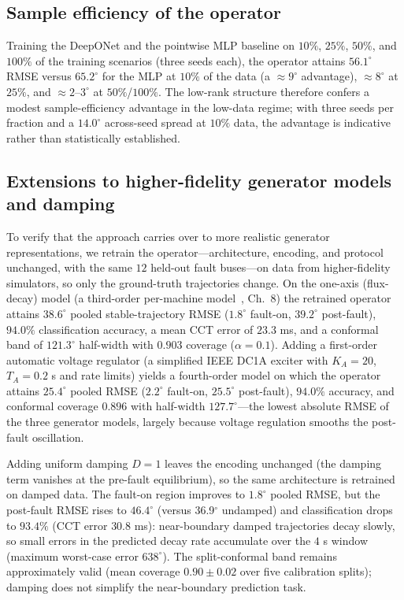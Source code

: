 \documentclass[5p,times]{elsarticle}
\newcommand{\rmsePost}{36.9}          %
\begin{document}
\subsection{Sample efficiency of the operator}
\label{sec:sampleeff}
Training the DeepONet
and the pointwise MLP baseline on $10\%$, $25\%$, $50\%$, and $100\%$ of the training scenarios
(three seeds each), the operator attains $56.1^\circ$ RMSE versus $65.2^\circ$ for the MLP at
$10\%$ of the data (a $\approx9^\circ$ advantage), $\approx8^\circ$ at $25\%$, and
$\approx2$--$3^\circ$ at $50\%$/$100\%$. The low-rank structure therefore confers a modest
sample-efficiency advantage in the low-data regime; with three seeds per fraction and a
$14.0^\circ$ across-seed spread at $10\%$ data, the advantage is indicative rather than
statistically established. 

\subsection{Extensions to higher-fidelity generator models and damping}
To verify that the approach carries over to more realistic generator representations, we retrain
the operator---architecture, encoding, and protocol unchanged, with the same $12$ held-out fault
buses---on data from higher-fidelity simulators, so only the ground-truth trajectories change.
On the one-axis (flux-decay) model (a third-order per-machine model~\cite{sauer1998dynamics},
Ch.~8) the retrained operator attains $38.6^\circ$ pooled stable-trajectory RMSE ($1.8^\circ$
fault-on, $39.2^\circ$ post-fault), $94.0\%$ classification accuracy, a mean CCT error of
$23.3$ ms, and a conformal band of $121.3^\circ$ half-width with $0.903$ coverage
($\alpha{=}0.1$). Adding a first-order automatic voltage regulator (a simplified IEEE DC1A
exciter with $K_A{=}20$, $T_A{=}0.2$ s and rate limits) yields a fourth-order model on which the
operator attains $25.4^\circ$ pooled RMSE ($2.2^\circ$ fault-on, $25.5^\circ$ post-fault),
$94.0\%$ accuracy, and conformal coverage $0.896$ with half-width $127.7^\circ$---the lowest
absolute RMSE of the three generator models, largely because voltage regulation smooths the
post-fault oscillation.

Adding uniform damping $D{=}1$ leaves the encoding unchanged (the damping term vanishes at
the pre-fault equilibrium), so the same architecture is retrained on damped data. The fault-on region improves to $1.8^\circ$ pooled RMSE, but the post-fault RMSE
rises to $46.4^\circ$ (versus \rmsePost{}$^\circ$ undamped) and classification drops to $93.4\%$
(CCT error $30.8$ ms): near-boundary damped trajectories decay slowly, so small errors in the
predicted decay rate accumulate over the $4$ s window (maximum worst-case error $638^\circ$). The
split-conformal band remains approximately valid (mean coverage $0.90\pm0.02$ over five
calibration splits); damping does not simplify the near-boundary prediction task.
\end{document}
